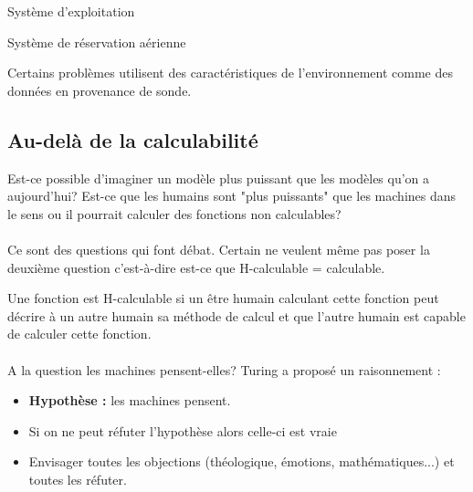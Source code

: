 \begin{myexem}
	Système d'exploitation
\end{myexem}

\begin{myexem}
	Système de réservation aérienne
\end{myexem}

\begin{myexem}
	Certains problèmes utilisent des caractéristiques de l'environnement comme 
	des données en provenance de sonde.
\end{myexem}

\subsection{Au-delà de la calculabilité}
\label{sub:au_del_de_la_calculabilit_}
Est-ce possible d'imaginer un modèle plus puissant que les modèles qu'on a 
aujourd'hui? Est-ce que les humains sont "plus puissants" que les machines dans 
le sens ou il pourrait calculer des fonctions non calculables?

\paragraph{} Ce sont des questions qui font débat. Certain ne veulent même pas 
poser la deuxième question c'est-à-dire est-ce que H-calculable = calculable.

\begin{mydef}[H-calculable]
	Une fonction est H-calculable si un être humain calculant cette 
	fonction peut décrire à un autre humain sa méthode de calcul et que 
	l'autre humain est capable de calculer cette fonction.
\end{mydef}

\paragraph{} A la question les machines pensent-elles? Turing a proposé un 
raisonnement : 
\begin{itemize}
	\item \textbf{Hypothèse :} les machines pensent.
	\item Si on ne peut réfuter l'hypothèse alors celle-ci est vraie
	\item Envisager toutes les objections (théologique, émotions, 
		mathématiques...) et toutes les réfuter.
\end{itemize}

